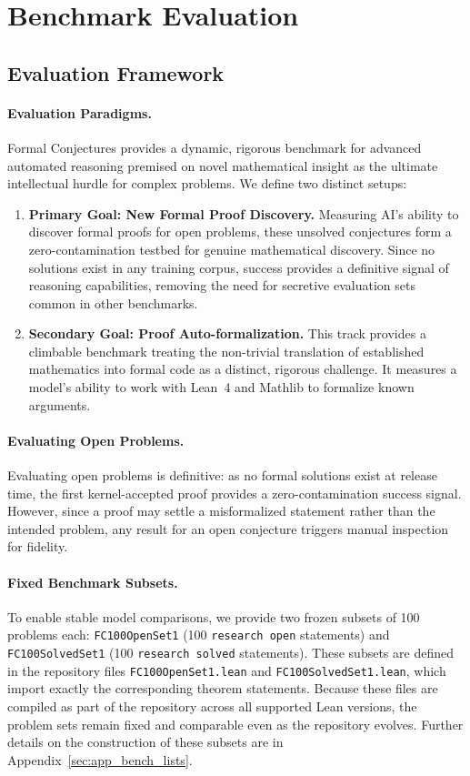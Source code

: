 \section{Benchmark Evaluation}\label{sec:experimental_evaluation}

\subsection{Evaluation Framework}\label{sec:experimental_setup}


\paragraph{Evaluation Paradigms.}
Formal Conjectures provides a dynamic, rigorous benchmark for advanced automated reasoning premised on novel mathematical insight as the ultimate intellectual hurdle for complex problems. We define two distinct setups:
\begin{enumerate}
    \item \textbf{Primary Goal: New Formal Proof Discovery.}
    Measuring AI's ability to discover formal proofs for open problems, these unsolved conjectures form a zero-contamination testbed for genuine mathematical discovery. Since no solutions exist in any training corpus, success provides a definitive signal of reasoning capabilities, removing the need for secretive evaluation sets common in other benchmarks.
    \item \textbf{Secondary Goal: Proof Auto-formalization.}
    This track provides a climbable benchmark treating the non-trivial translation of established mathematics into formal code as a distinct, rigorous challenge. It measures a model's ability to work with Lean~4 and Mathlib to formalize known arguments.
\end{enumerate}


\paragraph{Evaluating Open Problems.}
Evaluating open problems is definitive: as no formal solutions exist at release time, the first kernel-accepted proof provides a zero-contamination success signal.
However, since a proof may settle a misformalized statement rather than the intended problem, any result for an open conjecture triggers manual inspection for fidelity.


\paragraph{Fixed Benchmark Subsets.}
To enable stable model comparisons, we provide two frozen subsets of 100 problems each:
\texttt{FC100OpenSet1} (100 \texttt{research open} statements) and \texttt{FC100SolvedSet1} (100 \texttt{research solved} statements).
These subsets are defined in the repository files \texttt{FC100OpenSet1.lean} and \texttt{FC100SolvedSet1.lean}, which import exactly the corresponding theorem statements.
Because these files are compiled as part of the repository across all supported Lean versions, the problem sets remain fixed and comparable even as the repository evolves.
Further details on the construction of these subsets are in Appendix~\ref{sec:app_bench_lists}.


